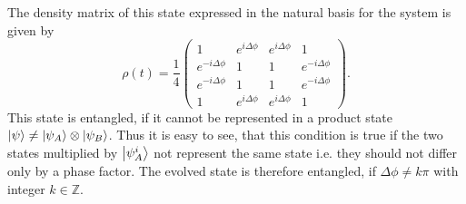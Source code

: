The density matrix of this state expressed in the natural basis for the system is given by
\begin{equation}
  \rho(t) = \frac{1}{4}
  \begin{pmatrix}
    1 & e^{i\Delta\phi}  & e^{i\Delta\phi} & 1 \\
    e^{-i\Delta\phi} & 1 & 1  & e^{-i\Delta\phi} \\
    e^{-i\Delta\phi} & 1  & 1 & e^{-i\Delta\phi} \\
    1 & e^{i\Delta\phi} & e^{i\Delta\phi} & 1
  \end{pmatrix}.
\end{equation}
This state is entangled, if it cannot be represented in a product state $\ket{\psi} \neq \ket{\psi_A}\otimes\ket{\psi_B}$. Thus it is easy to see, that this condition is true if the two states multiplied by $\ket{\psi_A^i}$ not represent the same state i.e. they should not differ only by a phase factor.
The evolved state is therefore entangled, if $\Delta \phi \neq k\pi$ with integer $k \in \mathbb{Z}$.



